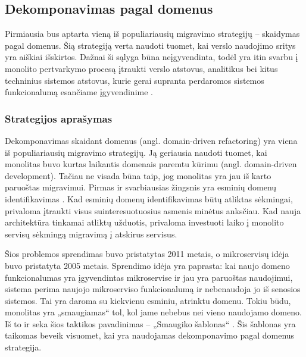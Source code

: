\documentclass{VUMIFPSbakalaurinis}
\begin{document}
\subsection{Dekomponavimas pagal domenus}
Pirmiausia bus aptarta vieną iš populiariausių migravimo strategijų – skaidymas pagal domenus. Šią strategiją verta naudoti tuomet, kai verslo naudojimo sritys yra aiškiai išskirtos. Dažnai  ši sąlyga būna neįgyvendinta, todėl yra itin svarbu į monolito pertvarkymo procesą įtraukti verslo atstovus, analitikus bei kitus techninius sistemos atstovus, kurie gerai supranta perdaromos sistemos funkcionalumą esančiame įgyvendinime \cite{Wal22}.

\subsubsection{Strategijos aprašymas}
Dekomponavimas skaidant domenus (angl. domain-driven refactoring) yra viena iš populiariausių migravimo strategijų. Ją geriausia naudoti tuomet, kai monolitas buvo kurtas laikantis domenais paremtu kūrimu (angl. domain-driven development). Tačiau ne visada būna taip, jog monolitas yra jau iš karto paruoštas migravimui. Pirmas ir svarbiausias žingsnis yra esminių domenų identifikavimas \cite{LZ22}. Kad esminių domenų identifikavimas būtų atliktas sėkmingai, privaloma įtraukti visus suinteresuotuosius asmenis minėtus anksčiau. Kad nauja architektūra tinkamai atliktų užduotis, privaloma investuoti laiko į monolito servisų sėkmingą migravimą į atskirus servisus. 

Šios problemos sprendimas buvo pristatytas 2011 metais, o mikroservisų idėja buvo pristatyta 2005 metais. Sprendimo idėja yra paprasta: kai naujo domeno funkcionalumas yra įgyvendintas mikroservise ir jau yra paruoštas naudojimui, sistema perima naujojo mikroserviso funkcionalumą ir nebenaudoja jo iš senosios sistemos. Tai yra daroma su kiekvienu esminiu, atrinktu domenu. Tokiu būdu, monolitas yra „smaugiamas“ tol, kol jame nebebus nei vieno naudojamo domeno. Iš to ir seka šios taktikos pavadinimas – „Smaugiko šablonas“ \cite{Beh18}. Šis šablonas yra taikomas beveik visuomet, kai yra naudojamas dekomponavimo pagal domenus strategija.
\end{document}
